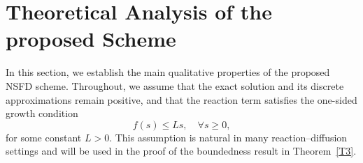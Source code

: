 \documentclass[final,12pt,3p]{elsarticle}
\theoremstyle{plain}
\theoremstyle{definition}
\theoremstyle{remark}
\begin{document}





\section{Theoretical Analysis of the proposed Scheme}\label{S3}
In this section, we establish the main qualitative properties of the proposed NSFD scheme. 
Throughout, we assume that the exact solution and its discrete approximations remain positive, and that the reaction term satisfies the one-sided growth condition
\begin{equation*}
   f(s)\le Ls, \quad \forall s\ge 0,
\end{equation*}
for some constant $L>0$. 
This assumption is natural in many reaction--diffusion settings and will be used in the proof of the boundedness result in Theorem~\ref{T3}.
\end{document}
